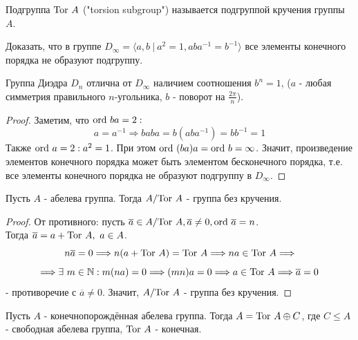 \begin{definition}
    Подгруппа $\textup{Tor } A$ ("torsion subgroup") называется подгруппой кручения группы $A$.
\end{definition}
\begin{exercise}
    Доказать, что в группе $D_\infty = \langle a, b\ |\ a^2 = 1, aba^{-1} = b^{-1} \rangle$ все элементы конечного порядка не образуют подгруппу.
\end{exercise}
\begin{remark}
    Группа Диэдра $D_n$ отлична от $D_\infty$ наличием соотношения $b^n = 1$, ($a$ - любая симметрия правильного $n$-угольника, $b$ - поворот на $\frac{2\pi}{n}$).
\end{remark}
\begin{proof}
    Заметим, что $\textup{ord } ba = 2:$
    \[a = a^{-1} \Longrightarrow baba = b(aba^{-1}) = bb^{-1} = 1\]
    Также $\textup{ord } a = 2: a^2 = 1$. При этом $\textup{ord } (ba)a = \textup{ord } b = \infty$. Значит, произведение элементов конечного порядка может быть элементом бесконечного порядка, т.е. все элементы конечного порядка не образуют подгруппу в $D_\infty$.
\end{proof}
\begin{lemmanum}
    Пусть $A$ - абелева группа. Тогда $A / \textup{Tor } A$ - группа без кручения.
\end{lemmanum}
\begin{proof}
    От противного: пусть $\overline{a} \in A / \textup{Tor } A, \overline{a} \neq 0, \textup{ord } \overline{a} = n$.\\
    Тогда $\overline{a} = a + \textup{Tor } A, \ a \in A$.
    \[n\overline{a} = 0 \Longrightarrow n(a + \textup{Tor } A) = \textup{Tor } A \Longrightarrow na \in \textup{Tor } A \Longrightarrow\]
    \[\Longrightarrow \exists \ m \in \mathbb{N}: m(na) = 0 \Longrightarrow (mn)a = 0 \Longrightarrow a \in \textup{Tor }A \Longrightarrow \overline{a} = 0\]
    - противоречие с $\overline{a} \neq 0$. Значит, $A / \textup{Tor } A$ - группа без кручения.
\end{proof}
\begin{lemmanum}
    Пусть $A$ - конечнопорождённая абелева группа. Тогда $A = \textup{Tor } A \oplus C$, где $C \leq A$ - свободная абелева группа, $\textup{Tor } A$ - конечная.
\end{lemmanum}
